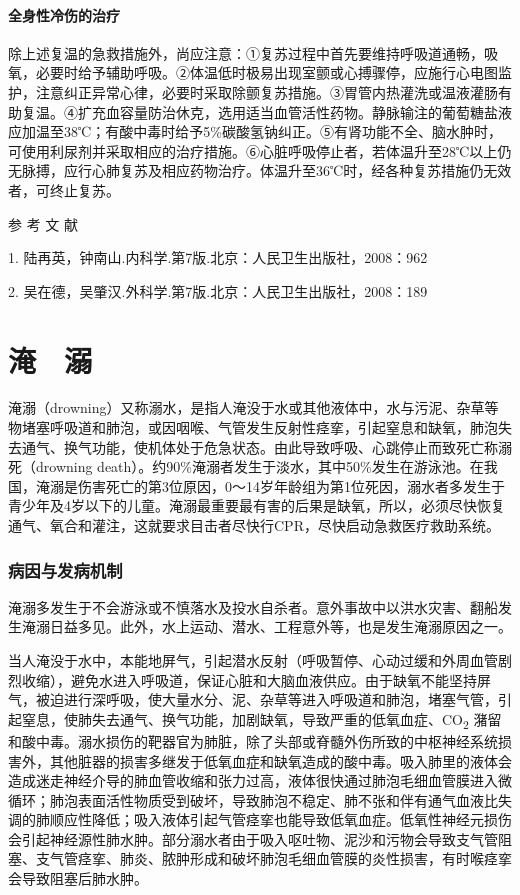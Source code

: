 \subsubsection{全身性冷伤的治疗}

除上述复温的急救措施外，尚应注意：①复苏过程中首先要维持呼吸道通畅，吸氧，必要时给予辅助呼吸。②体温低时极易出现室颤或心搏骤停，应施行心电图监护，注意纠正异常心律，必要时采取除颤复苏措施。③胃管内热灌洗或温液灌肠有助复温。④扩充血容量防治休克，选用适当血管活性药物。静脉输注的葡萄糖盐液应加温至38℃；有酸中毒时给予5\%碳酸氢钠纠正。⑤有肾功能不全、脑水肿时，可使用利尿剂并采取相应的治疗措施。⑥心脏呼吸停止者，若体温升至28℃以上仍无脉搏，应行心肺复苏及相应药物治疗。体温升至36℃时，经各种复苏措施仍无效者，可终止复苏。

\protect\hypertarget{text00359.html}{}{}

\hypertarget{text00359.htmlux5cux23CHP15-3-4}{}
参 考 文 献

1. 陆再英，钟南山.内科学.第7版.北京：人民卫生出版社，2008：962

2. 吴在德，吴肇汉.外科学.第7版.北京：人民卫生出版社，2008：189

\protect\hypertarget{text00360.html}{}{}

\chapter{淹　溺}

淹溺（drowning）又称溺水，是指人淹没于水或其他液体中，水与污泥、杂草等物堵塞呼吸道和肺泡，或因咽喉、气管发生反射性痉挛，引起窒息和缺氧，肺泡失去通气、换气功能，使机体处于危急状态。由此导致呼吸、心跳停止而致死亡称溺死（drowning
death）。约90\%淹溺者发生于淡水，其中50\%发生在游泳池。在我国，淹溺是伤害死亡的第3位原因，0～14岁年龄组为第1位死因，溺水者多发生于青少年及4岁以下的儿童。淹溺最重要最有害的后果是缺氧，所以，必须尽快恢复通气、氧合和灌注，这就要求目击者尽快行CPR，尽快启动急救医疗救助系统。

\subsection{病因与发病机制}

淹溺多发生于不会游泳或不慎落水及投水自杀者。意外事故中以洪水灾害、翻船发生淹溺日益多见。此外，水上运动、潜水、工程意外等，也是发生淹溺原因之一。

当人淹没于水中，本能地屏气，引起潜水反射（呼吸暂停、心动过缓和外周血管剧烈收缩），避免水进入呼吸道，保证心脏和大脑血液供应。由于缺氧不能坚持屏气，被迫进行深呼吸，使大量水分、泥、杂草等进入呼吸道和肺泡，堵塞气管，引起窒息，使肺失去通气、换气功能，加剧缺氧，导致严重的低氧血症、CO\textsubscript{2}
潴留和酸中毒。溺水损伤的靶器官为肺脏，除了头部或脊髓外伤所致的中枢神经系统损害外，其他脏器的损害多继发于低氧血症和缺氧造成的酸中毒。吸入肺里的液体会造成迷走神经介导的肺血管收缩和张力过高，液体很快通过肺泡毛细血管膜进入微循环；肺泡表面活性物质受到破坏，导致肺泡不稳定、肺不张和伴有通气血液比失调的肺顺应性降低；吸入液体引起气管痉挛也能导致低氧血症。低氧性神经元损伤会引起神经源性肺水肿。部分溺水者由于吸入呕吐物、泥沙和污物会导致支气管阻塞、支气管痉挛、肺炎、脓肿形成和破坏肺泡毛细血管膜的炎性损害，有时喉痉挛会导致阻塞后肺水肿。

